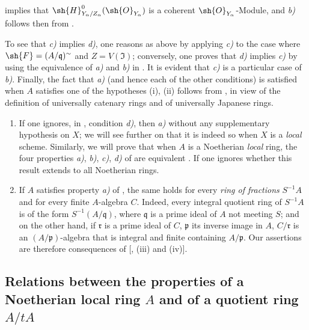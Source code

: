 \begin{corollary}[5.11.6]

implies that $\sh{H}^0_{Y_\alpha/Z_\alpha}(\sh{O}_{Y_\alpha})$ is a coherent $\sh{O}_{Y_\alpha}$-Module, and \emph{b)} follows then from .

To see that \emph{c)} implies \emph{d)}, one reasons as above by applying \emph{c)} to the case where $\sh{F}=(A/\mathfrak{q})^\sim$ and $Z=V(\mathfrak{I})$; conversely, one proves that \emph{d)} implies \emph{c)} by using the equivalence of \emph{a)} and \emph{b)} in .
It is evident that \emph{c)} is a particular case of \emph{b)}.
Finally, the fact that \emph{a)} (and hence each of the other conditions) is satisfied when $A$ satisfies one of the hypotheses (i), (ii) follows from , in view of the definition of universally catenary rings and of universally Japanese rings.
\end{corollary}

\begin{remarks}[5.11.7]
\label{IV.5.11.7}
\begin{enumerate}
  \item[\rm(i)] If one ignores, in , condition \emph{d)}, then \emph{a)} without any supplementary hypothesis on $X$; we will see further on  that it is indeed so when $X$ is a \emph{local} scheme.
Similarly, we will prove that when $A$ is a Noetherian \emph{local} ring, the four properties \emph{a)}, \emph{b)}, \emph{c)}, \emph{d)} of  are equivalent .
If one ignores whether this result extends to all Noetherian rings.
  \item[\rm(ii)] If $A$ satisfies property \emph{a)} of , the same holds for every \emph{ring of fractions} $S^{-1}A$ and for every finite $A$-algebra $C$.
Indeed, every integral quotient ring of $S^{-1}A$ is of the form $S^{-1}(A/\mathfrak{q})$, where $\mathfrak{q}$ is a prime ideal of $A$ not meeting $S$; and on the other hand, if $\mathfrak{r}$ is a prime ideal of $C$, $\mathfrak{p}$ its inverse image in $A$, $C/\mathfrak{r}$ is an $(A/\mathfrak{p})$-algebra that is integral and finite containing $A/\mathfrak{p}$.
Our assertions are therefore consequences of [, (iii) and (iv)].
\end{enumerate}
\end{remarks}


\subsection{Relations between the properties of a Noetherian local ring \texorpdfstring{$A$}{A} and of a quotient ring \texorpdfstring{$A/tA$}{A/tA}}
\label{subsection:IV.5.12}

